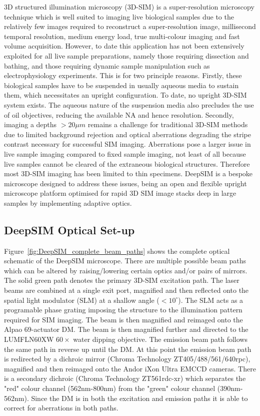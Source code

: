 3D structured illumination microscopy (3D-SIM) is a super-resolution microscopy technique which is well suited to imaging live biological samples due to the relatively few images required to reconstruct a super-resolution image, millisecond temporal resolution, medium energy load, true multi-colour imaging and fast volume acquisition.\cite{schermelleh2010guide,schermelleh2019super} 
However, to date this application has not been extensively exploited for all live sample preparations, namely those requiring dissection and bathing, and those requiring dynamic sample manipulation such as electrophysiology experiments. This is for two principle reasons. Firstly, these biological samples have to be suspended in usually aqueous  media to sustain them, which necessitates an upright configuration. To date, no upright 3D-SIM system exists. The aqueous nature of the suspension media also precludes the use of oil objectives, reducing the available NA and hence resolution. Secondly, imaging a depths $>20\mu m$ remains a challenge for traditional 3D-SIM methods due to limited background rejection and optical aberrations degrading the stripe contrast necessary for successful SIM imaging.\cite{wu2018faster} Aberrations pose a larger issue in live sample imaging compared to fixed sample imaging, not least of all because live samples cannot be cleared of the extraneous biological structures. Therefore most 3D-SIM imaging has been limited to thin specimens. DeepSIM is a bespoke microscope designed to address these issues, being an open and flexible upright microscope platform optimised for rapid 3D SIM image stacks deep in large samples by implementing adaptive optics. 

\subsection{DeepSIM Optical Set-up}
\label{subsec:DeepSIM_optics}

Figure~\ref{fig:DeepSIM_complete_beam_paths} shows the complete optical schematic of the DeepSIM microscope. There are multiple possible beam paths which can be altered by raising/lowering certain optics and/or pairs of mirrors. The solid green path denotes the primary 3D-SIM excitation path. The laser beams are combined at a single exit port, magnified and then reflected onto the spatial light modulator (SLM) at a shallow angle ($<10^{\circ}$). The SLM acts as a programable phase grating imposing the structure to the illumination pattern required for SIM imaging. The beam is then magnified and reimaged onto the Alpao 69-actuator DM. The beam is then magnified further and directed to the LUMFLN60XW $60\times$ water dipping objective. The emission beam path follows the same path in reverse up until the DM. At this point the emission beam path is redirected by a dichroic mirror (Chroma Technology ZT405/488/561/640rpc), magnified and then reimaged onto the Andor iXon Ultra EMCCD cameras. There is a secondary dichroic (Chroma Technology ZT561rdc-xr) which separates the "red" colour channel (562nm-800nm) from the "green" colour channel (390nm-562nm). Since the DM is in both the excitation and emission paths it is able to correct for aberrations in both paths.

